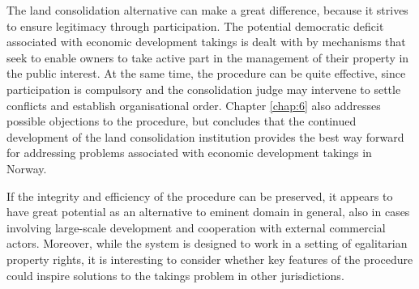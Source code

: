 
The land consolidation alternative can make a great difference, because it strives to ensure legitimacy through participation. The potential democratic deficit associated with economic development takings  is dealt with by mechanisms that seek to enable owners to take active part in the management of their property in the public interest. At the same time, the procedure can be quite effective, since participation is compulsory and the consolidation judge may intervene to settle conflicts and establish organisational order. Chapter \ref{chap:6} also addresses possible objections to the procedure, but concludes that the continued development of the land consolidation institution provides the best way forward for addressing problems associated with economic development takings in Norway.


If the integrity and efficiency of the procedure can be preserved, it appears to have great potential as an alternative to eminent domain in general, also in cases involving large-scale development and cooperation with external commercial actors. Moreover, while the system is designed to work in a setting of egalitarian property rights, it is interesting to consider whether key features of the procedure could inspire solutions to the takings problem in other jurisdictions. %

